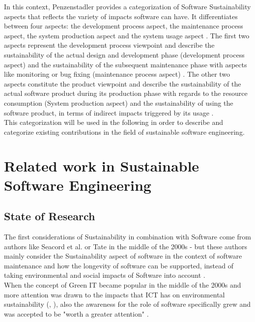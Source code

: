 \documentclass[oribibl]{llncs}
\begin{document}
In this context, Penzenstadler \cite{penzenstadler_supporting_2012} provides a categorization of Software Sustainability aspects that reflects the variety of impacts software can have. It differentiates between four aspects: the development process aspect, the maintenance process aspect, the system production aspect and the system usage aspect \cite{penzenstadler_supporting_2012}. The first two aspects represent the development process viewpoint and describe the sustainability of the actual design and development phase (development process aspect) and the sustainability of the subsequent maintenance phase with aspects like monitoring or bug fixing (maintenance process aspect) \cite{penzenstadler_sustainability_2012}. The other two aspects constitute the product viewpoint and describe the sustainability of the actual software product during its production phase with regards to the resource consumption (System production aspect) and the sustainability of using the software product, in terms of indirect impacts triggered by its usage \cite{penzenstadler_sustainability_2012}.\\ %
This categorization will be used in the following in order to describe and categorize existing contributions in the field of sustainable software engineering.


\section{Related work in Sustainable Software Engineering} 
\subsection{State of Research} The first considerations of Sustainability in combination with Software come from authors like Seacord et al. \cite{seacord_measuring_2003} or Tate \cite{tate_sustainable_2005} in the middle of the 2000s - but these authors mainly consider the Sustainability aspect of software in the context of software maintenance and how the longevity of software can be supported, %
 instead of taking environmental and social impacts of Software into account \cite{albertao_measuring_2010}.\\ 
When the concept of Green IT became popular in the middle of the 2000s and more attention was drawn to the impacts that ICT has on environmental sustainability (\cite{berkhout_impacts_2001}, \cite{hilty_relevance_2006}), also the awareness for the role of software specifically grew and was accepted to be "worth a greater attention" \cite{capra_green_2009}.
\end{document}
